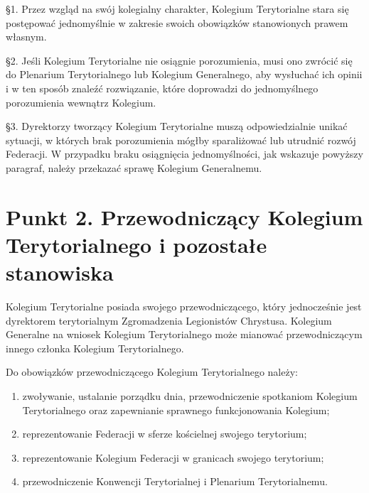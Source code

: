 
 \S{}1. Przez wzgląd na swój kolegialny charakter, Kolegium Terytorialne stara się postępować jednomyślnie w zakresie swoich obowiązków stanowionych prawem własnym.

\S{}2. Jeśli Kolegium Terytorialne nie osiągnie porozumienia, musi ono zwrócić się do Plenarium Terytorialnego lub Kolegium Generalnego, aby wysłuchać ich opinii i w ten sposób znaleźć rozwiązanie, które doprowadzi do jednomyślnego porozumienia wewnątrz Kolegium.

\S{}3. Dyrektorzy tworzący Kolegium Terytorialne muszą odpowiedzialnie unikać sytuacji, w których brak porozumienia mógłby sparaliżować lub utrudnić rozwój Federacji. W przypadku braku osiągnięcia jednomyślności, jak wskazuje powyższy paragraf, należy przekazać sprawę Kolegium Generalnemu.


\section{Punkt 2. Przewodniczący Kolegium Terytorialnego i pozostałe stanowiska}


 Kolegium Terytorialne posiada swojego przewodniczącego, który jednocześnie jest dyrektorem terytorialnym Zgromadzenia Legionistów Chrystusa. Kolegium Generalne na wniosek Kolegium Terytorialnego może mianować przewodniczącym innego członka Kolegium Terytorialnego. 


 Do obowiązków przewodniczącego Kolegium Terytorialnego należy:
\begin{enumerate}
	
	\item zwoływanie, ustalanie porządku dnia, przewodniczenie spotkaniom Kolegium Terytorialnego oraz zapewnianie sprawnego funkcjonowania Kolegium;
	
	\item reprezentowanie Federacji w sferze kościelnej swojego terytorium;
	
	\item reprezentowanie Kolegium Federacji w granicach swojego terytorium;
	
	\item przewodniczenie Konwencji Terytorialnej i Plenarium Terytorialnemu.
\end{enumerate}


